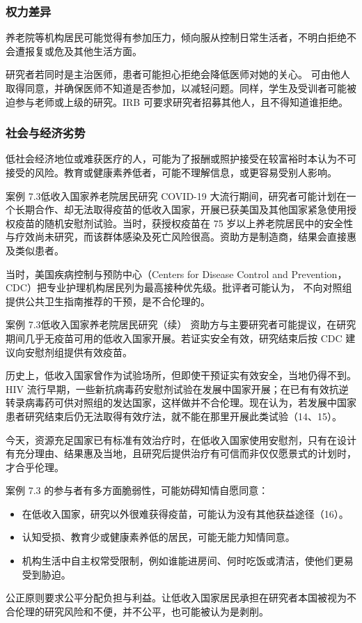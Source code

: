 \subsubsection{权力差异}
养老院等机构居民可能觉得有参加压力，倾向服从控制日常生活者，不明白拒绝不会遭报复或危及其他生活方面。

研究者若同时是主治医师，患者可能担心拒绝会降低医师对她的关心。
可由他人取得同意，并确保医师不知道是否参加，以减轻问题。同样，学生及受训者可能被迫参与老师或上级的研究。IRB 可要求研究者招募其他人，且不得知道谁拒绝。

\subsubsection{社会与经济劣势}
低社会经济地位或难获医疗的人，可能为了报酬或照护接受在较富裕时本认为不可接受的风险。教育或健康素养低者，可能不理解信息，或更容易受别人影响。
\begin{bookbox}{案例 7.3\quad 低收入国家养老院居民研究}
COVID-19 大流行期间，研究者可能计划在一个长期合作、却无法取得疫苗的低收入国家，开展已获美国及其他国家紧急使用授权疫苗的随机安慰剂试验。当时，获授权疫苗在 75 岁以上养老院居民中的安全性与疗效尚未研究，而该群体感染及死亡风险很高。资助方是制造商，结果会直接惠及类似患者。
\end{bookbox}
当时，美国疾病控制与预防中心（Centers for Disease Control and Prevention，CDC）把专业护理机构居民列为最高接种优先级。批评者可能认为，
不向对照组提供公共卫生指南推荐的干预，是不合伦理的。
\begin{bookbox}{案例 7.3\quad 低收入国家养老院居民研究（续）}
资助方与主要研究者可能提议，在研究期间几乎无疫苗可用的低收入国家开展。若证实安全有效，研究结束后按 CDC 建议向安慰剂组提供有效疫苗。
\end{bookbox}
历史上，低收入国家曾作为试验场所，但即使干预证实有效安全，当地仍得不到。HIV 流行早期，一些新抗病毒药安慰剂试验在发展中国家开展；在已有有效抗逆转录病毒药可供对照组的发达国家，这样做并不合伦理。现在认为，若发展中国家患者研究结束后仍无法取得有效疗法，就不能在那里开展此类试验（14、15）。

今天，资源充足国家已有标准有效治疗时，在低收入国家使用安慰剂，只有在设计有充分理由、结果惠及当地，且研究后提供治疗有可信而非仅仅愿景式的计划时，才合乎伦理。

案例 7.3 的参与者有多方面脆弱性，可能妨碍知情自愿同意：
\begin{itemize}
\item 在低收入国家，研究以外很难获得疫苗，可能认为没有其他获益途径（16）。
\item 认知受损、教育少或健康素养低的居民，可能无能力知情同意。
\item 机构生活中自主权常受限制，例如谁能进房间、何时吃饭或清洁，使他们更易受到胁迫。
\end{itemize}
公正原则要求公平分配负担与利益。让低收入国家居民承担在研究者本国被视为不合伦理的研究风险和不便，并不公平，也可能被认为是剥削。

